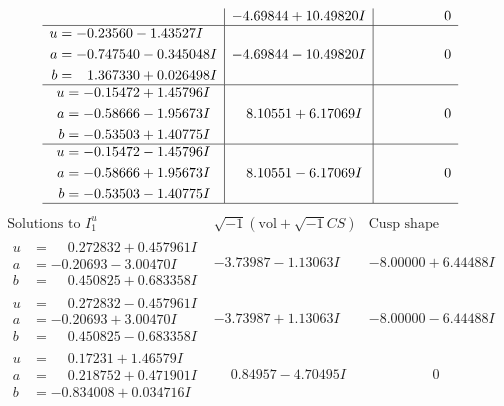 \documentclass[1p]{elsarticle_modified}
\theoremstyle{definition}
\newcommand{\I}{\sqrt{-1}}
\begin{document}
$$\begin{array}{c|c|c}
 & -4.69844 + 10.49820 I & \phantom{-0.000000 } 0 \\ \hline\begin{aligned}
u &= -0.23560 - 1.43527 I \\
a &= -0.747540 - 0.345048 I \\
b &= \phantom{-}1.367330 + 0.026498 I\end{aligned}
 & -4.69844 - 10.49820 I & \phantom{-0.000000 } 0 \\ \hline\begin{aligned}
u &= -0.15472 + 1.45796 I \\
a &= -0.58666 - 1.95673 I \\
b &= -0.53503 + 1.40775 I\end{aligned}
 & \phantom{-}8.10551 + 6.17069 I & \phantom{-0.000000 } 0 \\ \hline\begin{aligned}
u &= -0.15472 - 1.45796 I \\
a &= -0.58666 + 1.95673 I \\
b &= -0.53503 - 1.40775 I\end{aligned}
 & \phantom{-}8.10551 - 6.17069 I & \phantom{-0.000000 } 0\\
 \hline 
 \end{array}$$\newpage$$\begin{array}{c|c|c}  
\text{Solutions to }I^u_{1}& \I (\text{vol} + \sqrt{-1}CS) & \text{Cusp shape}\\
 \hline 
\begin{aligned}
u &= \phantom{-}0.272832 + 0.457961 I \\
a &= -0.20693 - 3.00470 I \\
b &= \phantom{-}0.450825 + 0.683358 I\end{aligned}
 & -3.73987 - 1.13063 I & -8.00000 + 6.44488 I \\ \hline\begin{aligned}
u &= \phantom{-}0.272832 - 0.457961 I \\
a &= -0.20693 + 3.00470 I \\
b &= \phantom{-}0.450825 - 0.683358 I\end{aligned}
 & -3.73987 + 1.13063 I & -8.00000 - 6.44488 I \\ \hline\begin{aligned}
u &= \phantom{-}0.17231 + 1.46579 I \\
a &= \phantom{-}0.218752 + 0.471901 I \\
b &= -0.834008 + 0.034716 I\end{aligned}
 & \phantom{-}0.84957 - 4.70495 I & \phantom{-0.000000 } 0 \\ \hline\begin{aligned}

\end{aligned}
\end{array}$$
\end{document}

